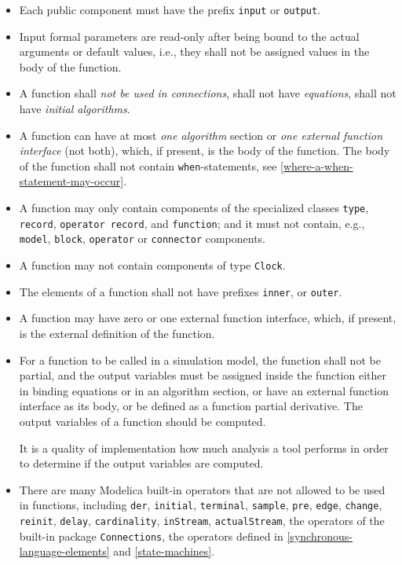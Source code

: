 \begin{itemize}
\item
  Each public component must have the prefix \lstinline!input! or \lstinline!output!.
\item
  Input formal parameters are read-only after being bound to the actual arguments or default values, i.e., they shall not be assigned values in the body of the function.
\item
  A function shall \emph{not be used in connections}, shall not have \emph{equations}, shall not have \emph{initial algorithms}.
\item
  A function can have at most \emph{one algorithm} section or \emph{one external function interface} (not both), which, if present, is the body of the function.
  The body of the function shall not contain \lstinline!when!-statements, see \cref{where-a-when-statement-may-occur}.
\item
  A function may only contain components of the specialized classes \lstinline!type!, \lstinline!record!, \lstinline!operator record!, and \lstinline!function!; and it must not contain, e.g., \lstinline!model!, \lstinline!block!, \lstinline!operator! or \lstinline!connector! components.
\item
  A function may not contain components of type \lstinline!Clock!.
\item
  The elements of a function shall not have prefixes \lstinline!inner!, or \lstinline!outer!.
\item
  A function may have zero or one external function interface, which, if present, is the external definition of the function.
\item
  For a function to be called in a simulation model, the function shall not be partial, and the output variables must be assigned inside the function either in binding equations or in an algorithm section, or have an external function interface as its body, or be defined as a function partial derivative.
  The output variables of a function should be computed.
  \begin{nonnormative}
  It is a quality of implementation how much analysis a tool performs in order to determine if the output variables are computed.
  \end{nonnormative}
\item
  There are many Modelica built-in operators that are not allowed to be used in functions, including \lstinline!der!, \lstinline!initial!, \lstinline!terminal!, \lstinline!sample!, \lstinline!pre!, \lstinline!edge!, \lstinline!change!, \lstinline!reinit!, \lstinline!delay!, \lstinline!cardinality!, \lstinline!inStream!, \lstinline!actualStream!, the operators of the built-in package \lstinline!Connections!, the operators defined in \cref{synchronous-language-elements} and \cref{state-machines}.

\end{itemize}
